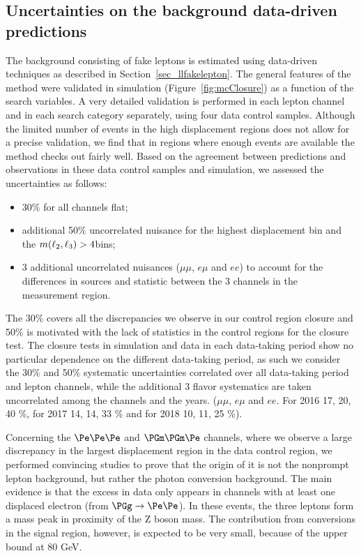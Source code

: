 \subsection{Uncertainties on the background data-driven predictions}
The background consisting of fake leptons is estimated
using data-driven techniques as described in
Section~\ref{sec_llfakelepton}. The general features of the method were
validated in simulation (Figure~\ref{fig:mcClosure}) as a function of
the search variables. A very detailed validation is performed in each
lepton channel and in each search category separately, using
four data control samples. Although the limited number of events in
the high displacement regions does not allow for a precise validation,
we find that in regions where enough events are available the method
checks out fairly well. 
Based on the agreement between predictions and observations in these
data control samples and simulation, we assessed the uncertainties as
follows:
\begin{itemize}
\setlength\itemsep{-0.2em}
\item 30$\%$ for all channels flat;
\item additional 50$\%$ uncorrelated nuisance for the highest displacement bin and the $m(\ell_2,\ell_3) > 4$\GeV bins;
\item 3 additional uncorrelated nuisances ($\mu\mu$, $e\mu$ and $ee$) to account for the differences in sources and statistic between the 3 channels in the \Dfr measurement region.
\end{itemize}
The 30$\%$ covers all the discrepancies we observe in our control region closure and 50$\%$ is motivated with the lack of statistics in the control regions for the closure test. 
The closure tests in simulation and data in each data-taking period
show no particular dependence on the different data-taking period, as such we consider the 30$\%$ and 50$\%$ systematic uncertainties correlated over all data-taking period and lepton channels, while the additional 3 flavor systematics are taken uncorrelated among the channels and the years. ($\mu\mu$, $e\mu$ and $ee$. For 2016 17, 20, 40 $\%$, for 2017 14, 14, 33 $\%$ and for 2018 10, 11, 25 $\%$).

Concerning the $\Pe\Pe\Pe$ and $\PGm\PGm\Pe$ channels, where we observe
a large discrepancy in the largest displacement region in the
data control region, we performed convincing studies to prove that the origin of it is not
the nonprompt lepton background, but rather the photon conversion
background.
The main evidence is that the excess in data only appears in channels
with at least one displaced electron (from $\PGg\to\Pe\Pe$).
In these events, the three leptons form a mass peak in proximity of the Z boson
mass. The contribution from conversions in the signal region, however,
is expected to be very small, because of the \mlll upper bound at 80 GeV.

